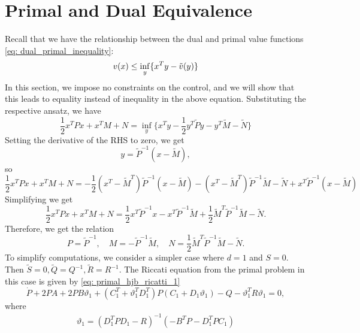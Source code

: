 \newpage

\section{Primal and Dual Equivalence}\label{Primal and Dual Equivalence}
Recall that we have the relationship between the dual and primal value functions \eqref{eq: dual_primal_inequality}:
\begin{equation*}
    v(x) \le \inf_y \{x^T y - \Tilde{v}(y)  \}
\end{equation*}
In this section, we impose no constraints on the control, and we will show that this leads to equality instead of inequality in the above equation. Substituting the respective ansatz, we have
\begin{equation*}
    \frac12 x^T P x + x^T M + N = \inf_y \bigg\{ x^T y - \frac12 y^T \tilde{P} y - y^T \tilde{M} - \tilde{N}  \bigg\}
\end{equation*}
Setting the derivative of the RHS to zero, we get 
\begin{equation*}
    y = \tilde{P}^{-1}(x - \tilde{M}),
\end{equation*}
so
\begin{equation*}
    \frac12 x^T P x + x^T M + N  = - \frac12 (x^T - \tilde{M}^T)\tilde{P}^{-1} (x-\tilde{M}) - (x^T - \tilde{M}^T)\tilde{P}^{-1} \tilde{M} - \tilde{N} + x^T \tilde{P}^{-1}(x - \tilde{M})
\end{equation*}
Simplifying we get
\begin{equation*}
    \frac12 x^T P x + x^T M + N = \frac12 x^T \tilde{P}^{-1}x - x^T \tilde{P}^{-1}\tilde{M} + \frac12 \tilde{M}^T \tilde{P}^{-1} \tilde{M} - \tilde{N}.
\end{equation*}
Therefore, we get the relation
\begin{equation}
    P = \tilde{P}^{-1}, \quad M = -\tilde{P}^{-1} \tilde{M}, \quad N =  \frac12 \tilde{M}^T \tilde{P}^{-1} \tilde{M} - \tilde{N}. \label{eq: primal_dual_relationship}
\end{equation}
To simplify computations, we consider a simpler case where $d=1$ and $S = 0$. Then $\tilde{S}=0, \tilde{Q}= Q^{-1}, \tilde{R} = R^{-1}$.
The Riccati equation from the primal problem in this case is given by \eqref{eq: primal_hjb_ricatti_1}
\begin{equation*}
     \dot{P}  +  2P A + 2P B \vartheta_1 + (C_1^T + \vartheta_1^T D_1^T)P(C_1 + D_1 \vartheta_1) 
     -  Q -  \vartheta_1^T R \vartheta_1 = 0,
\end{equation*}
where 
\begin{align*}
    \vartheta_1 = ( D_1^T  P D_1 - R)^{-1} ( - B^T  P - D_1^T  P C_1 )
\end{align*}
